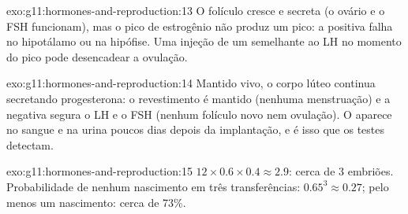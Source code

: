 \begin{solution}{exo:g11:hormones-and-reproduction:13}
O folículo cresce e secreta (o ovário e o FSH funcionam), mas o pico de
estrogênio não produz um pico: a  positiva falha no
hipotálamo ou na hipófise. Uma injeção de um  semelhante ao LH
no momento do pico pode desencadear a ovulação.
\end{solution}

\begin{solution}{exo:g11:hormones-and-reproduction:14}
Mantido vivo, o corpo lúteo continua secretando progesterona: o
revestimento é mantido (nenhuma menstruação) e a 
negativa segura o LH e o FSH (nenhum folículo novo nem ovulação). O
 aparece no sangue e na urina poucos dias depois da
implantação, e é isso que os testes detectam.
\end{solution}

\begin{solution}{exo:g11:hormones-and-reproduction:15}
$12 \times 0.6 \times 0.4 \approx 2.9$: cerca de 3 embriões.
Probabilidade de nenhum nascimento em três transferências:
$0.65^3 \approx 0.27$; pelo menos um nascimento: cerca de 73\%.
\end{solution}

